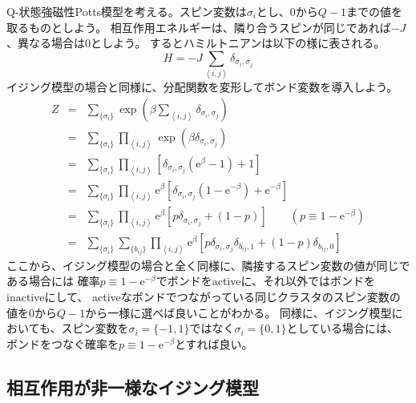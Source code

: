 \documentclass{jarticle}
\begin{document}
Q-状態強磁性Potts模型を考える。スピン変数は$\sigma_i$とし、$0$から$Q-1$までの値を取るものとしよう。
相互作用エネルギーは、隣り合うスピンが同じであれば$-J$、異なる場合は$0$としよう。
するとハミルトニアンは以下の様に表される。
\begin{equation}
  H = -J \sum_{\left<i,j\right>} \delta_{\sigma_i,\sigma_j}
\end{equation}
イジング模型の場合と同様に、分配関数を変形してボンド変数を導入しよう。
\begin{eqnarray}
  Z &=& \sum_{\{\sigma_i\}} \exp\left(\beta \sum_{\left<i,j\right>} \delta_{\sigma_i,\sigma_j} \right)\\
  &=& \sum_{\{\sigma_i\}} \prod_{\left<i,j\right>}  \exp\left(\beta \delta_{\sigma_i,\sigma_j} \right)\\
  &=& \sum_{\{\sigma_i\}} \prod_{\left<i,j\right>} \left[  \delta_{\sigma_i,\sigma_j} (\mathrm{e}^{\beta} -1) +1 \right] \\
  &=& \sum_{\{\sigma_i\}} \prod_{\left<i,j\right>} \mathrm{e}^{\beta} \left[  \delta_{\sigma_i,\sigma_j} (1 - \mathrm{e}^{-\beta}) +\mathrm{e}^{-\beta} \right] \\
  &=& \sum_{\{\sigma_i\}}  \prod_{\left<i,j\right>} \mathrm{e}^{\beta} \left[  p \delta_{\sigma_i,\sigma_j} + (1-p)\right] \qquad  (p \equiv 1 - \mathrm{e}^{-\beta}) \\
  &=& \sum_{\{\sigma_i\}} \sum_{\{b_{ij}\}}  \prod_{\left<i,j\right>} \mathrm{e}^{\beta} \left[  p \delta_{\sigma_i,\sigma_j}  \delta_{b_{ij},1}  + (1-p)  \delta_{b_{ij},0} \right]
\end{eqnarray}
ここから、イジング模型の場合と全く同様に、隣接するスピン変数の値が同じである場合には
確率$p \equiv 1 - \mathrm{e}^{-\beta}$でボンドをactiveに、それ以外ではボンドをinactiveにして、
activeなボンドでつながっている同じクラスタのスピン変数の値を$0$から$Q-1$から一様に選べば良いことがわかる。
同様に、イジング模型においても、スピン変数を$\sigma_i = \{-1,1\}$ではなく$\sigma_i = \{0,1\}$としている場合には、
ボンドをつなぐ確率を$p \equiv 1 - \mathrm{e}^{-\beta}$とすれば良い。

\subsection{相互作用が非一様なイジング模型}
\end{document}
